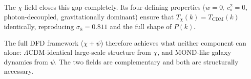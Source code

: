 \documentclass[12pt,a4paper]{article}
\newcommand{\LCDM}{\Lambda\mathrm{CDM}}
\begin{document}
The $\chi$ field closes this gap completely. Its four defining properties
($w = 0$, $c_s^2 = 0$, photon-decoupled, gravitationally dominant)
ensure that $T_\chi(k) = T_{\mathrm{CDM}}(k)$ identically, reproducing
$\sigma_8 = 0.811$ and the full shape of $P(k)$.

The full DFD framework ($\chi + \psi$) therefore achieves what neither
component can alone: $\LCDM$-identical large-scale structure from $\chi$,
and MOND-like galaxy dynamics from $\psi$. The two fields are
complementary and both are structurally necessary.
\end{document}
